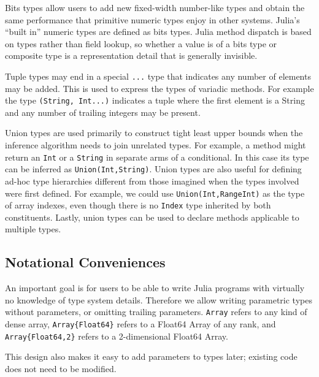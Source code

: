 \documentclass[9pt]{sigplanconf}
\begin{document}
Bits types allow users to add new fixed-width number-like types and obtain the
same performance that primitive numeric types enjoy in other systems. Julia's
``built in'' numeric types are defined as bits types. Julia method dispatch
is based on types rather than field lookup, so whether a value is of a bits
type or composite type is a representation detail that is generally
invisible.

Tuple types may end in a special {\tt ...} type that
indicates any number of elements may be added. This is used to express the
types of variadic methods. For example the type {\tt (String, Int...)}
indicates a tuple where the first element is a String and any number of
trailing integers may be present.

Union types are used primarily to construct tight least upper bounds
when the inference algorithm needs to join unrelated types. For example,
a method might return an {\tt Int} or a {\tt String} in separate
arms of a conditional. In this case its type can be inferred as
{\tt Union(Int,String)}. Union types are also useful for defining
ad-hoc type hierarchies different from those imagined when the types
involved were first defined. For example, we could use
{\tt Union(Int,Range{Int})} as the type of array indexes, even though
there is no {\tt Index} type inherited by both constituents. Lastly,
union types can be used to declare methods applicable to multiple types.


\subsection{Notational Conveniences}

An important goal is for users to be able to write Julia programs with
virtually no knowledge of type system details. Therefore we allow writing
parametric types without parameters, or omitting trailing parameters.
{\tt Array} refers to any kind of dense array, {\tt Array\{Float64\}} refers
to a Float64 Array of any rank, and {\tt Array\{Float64,2\}} refers to a
2-dimensional Float64 Array.

This design also makes it easy to add parameters to types later; existing
code does not need to be modified.
\end{document}
